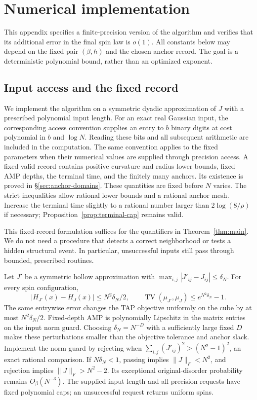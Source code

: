 \documentclass[11pt,reqno]{amsart}
\newcommand{\TV}{\operatorname{TV}}
\begin{document}
\section{Numerical implementation}\label{sec:numerical}

This appendix specifies a finite-precision version of the algorithm and verifies that its additional error in the final spin law is $o(1)$. All constants below may depend on the fixed pair $(\beta,h)$ and the chosen anchor record. The goal is a deterministic polynomial bound, rather than an optimized exponent.

\subsection{Input access and the fixed record}

We implement the algorithm on a symmetric dyadic approximation of $J$ with a prescribed polynomial input length. For an exact real Gaussian input, the corresponding access convention supplies an entry to $b$ binary digits at cost polynomial in $b$ and $\log N$. Reading these bits and all subsequent arithmetic are included in the computation. The same convention applies to the fixed parameters when their numerical values are supplied through precision access. A fixed valid record contains positive curvature and radius lower bounds, fixed AMP depths, the terminal time, and the finitely many anchors. Its existence is proved in \S\ref{sec:anchor-domains}. These quantities are fixed before $N$ varies. The strict inequalities allow rational lower bounds and a rational anchor mesh. Increase the terminal time slightly to a rational number larger than $2\log(8/\rho)$ if necessary; Proposition~\ref{prop:terminal-cap} remains valid.

This fixed-record formulation suffices for the quantifiers in Theorem~\ref{thm:main}. We do not need a procedure that detects a correct neighborhood or tests a hidden structural event. In particular, unsuccessful inputs still pass through bounded, prescribed routines.

Let $J'$ be a symmetric hollow approximation with $\max_{i,j}|J'_{ij}-J_{ij}|\le\delta_N$. For every spin configuration,
\[
 |H_{J'}(x)-H_J(x)|\le N^2\delta_N/2,
 \qquad \TV(\mu_{J'},\mu_J)\le e^{N^2\delta_N}-1.
\]
The same entrywise error changes the TAP objective uniformly on the cube by at most $N^2\delta_N/2$. Fixed-depth AMP is polynomially Lipschitz in the matrix entries on the input norm guard. Choosing $\delta_N=N^{-D}$ with a sufficiently large fixed $D$ makes these perturbations smaller than the objective tolerance and anchor slack. Implement the norm guard by rejecting when $\sum_{i,j}(J'_{ij})^2>(N^2-1)^2$, an exact rational comparison. If $N\delta_N<1$, passing implies $\|J\|_F<N^2$, and rejection implies $\|J\|_F>N^2-2$. Its exceptional original-disorder probability remains $O_\beta(N^{-3})$. The supplied input length and all precision requests have fixed polynomial caps; an unsuccessful request returns uniform spins.
\end{document}
